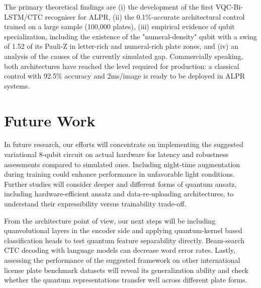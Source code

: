 \documentclass[preprint,12pt]{elsarticle}
\begin{document}
The primary theoretical findings are (i) the development of the first VQC-Bi-LSTM/CTC recogniser for ALPR, (ii) the 0.1\%-accurate architectural control trained on a large sample (100,000 plates), (iii) empirical evidence of qubit specialization, including the existence of the "numeral-density" qubit with a swing of 1.52 of its Pauli-Z in letter-rich and numeral-rich plate zones, and (iv) an analysis of the causes of the currently simulated gap. Commercially speaking, both architectures have reached the level required for production: a classical control with 92.5\% accuracy and 2ms/image is ready to be deployed in ALPR systems.

\section{Future Work}
In future research, our efforts will concentrate on implementing the suggested variational 8-qubit circuit on actual hardware for latency and robustness assessments compared to simulated ones. Including night-time augmentation during training could enhance performance in unfavorable light conditions. Further studies will consider deeper and different forms of quantum ansatz, including hardware-efficient ansatz and data-re-uploading architectures, to understand their expressibility versus trainability trade-off.

From the architecture point of view, our next steps will be including quanvolutional layers in the encoder side and applying quantum-kernel based classification heads to test quantum feature separability directly. Beam-search CTC decoding with language models can decrease word error rates. Lastly, assessing the performance of the suggested framework on other international license plate benchmark datasets will reveal its generalization ability and check whether the quantum representations transfer well across different plate forms.
\end{document}
